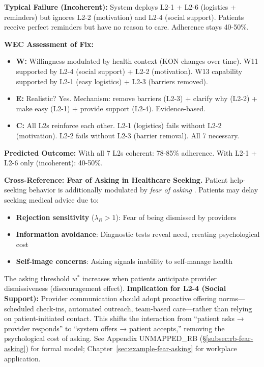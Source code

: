 \documentclass[11pt, a4paper]{article}
\begin{document}
\textbf{Typical Failure (Incoherent):} System deploys L2-1 + L2-6 (logistics + reminders) but ignores L2-2 (motivation) and L2-4 (social support). Patients receive perfect reminders but have no reason to care. Adherence stays 40-50\%.

\textbf{WEC Assessment of Fix:}
\begin{itemize}[nosep]
    \item \textbf{W:} Willingness modulated by health context (KON changes over time). W11 supported by L2-4 (social support) + L2-2 (motivation). W13 capability supported by L2-1 (easy logistics) + L2-3 (barriers removed).
    \item \textbf{E:} Realistic? Yes. Mechanism: remove barriers (L2-3) + clarify why (L2-2) + make easy (L2-1) + provide support (L2-4). Evidence-based.
    \item \textbf{C:} All L2s reinforce each other. L2-1 (logistics) fails without L2-2 (motivation). L2-2 fails without L2-3 (barrier removal). All 7 necessary.
\end{itemize}

\textbf{Predicted Outcome:} With all 7 L2s coherent: 78-85\% adherence. With L2-1 + L2-6 only (incoherent): 40-50\%.

\textbf{Cross-Reference: Fear of Asking in Healthcare Seeking.}
Patient help-seeking behavior is additionally modulated by \emph{fear of asking}
\citep{benabou2022hurts}. Patients may delay seeking medical advice due to:
\begin{itemize}[nosep]
    \item \textbf{Rejection sensitivity} ($\lambda_R > 1$): Fear of being dismissed by providers
    \item \textbf{Information avoidance}: Diagnostic tests reveal need, creating psychological cost
    \item \textbf{Self-image concerns}: Asking signals inability to self-manage health
\end{itemize}
The asking threshold $w^*$ increases when patients anticipate provider dismissiveness
(discouragement effect). \textbf{Implication for L2-4 (Social Support):} Provider
communication should adopt proactive offering norms---scheduled check-ins, automated
outreach, team-based care---rather than relying on patient-initiated contact. This
shifts the interaction from ``patient asks → provider responds'' to ``system offers
→ patient accepts,'' removing the psychological cost of asking. See Appendix UNMAPPED_RB
(\S\ref{subsec:rb-fear-asking}) for formal model; Chapter~\ref{sec:example-fear-asking}
for workplace application.
\end{document}
